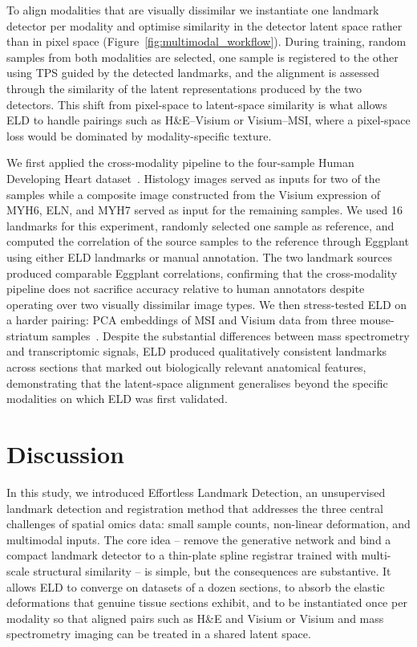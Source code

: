 \documentclass[11pt]{article}
\begin{document}
To align modalities that are visually dissimilar we instantiate one landmark detector per modality and optimise similarity in the detector latent space rather than in pixel space (Figure~\ref{fig:multimodal_workflow}). During training, random samples from both modalities are selected, one sample is registered to the other using TPS guided by the detected landmarks, and the alignment is assessed through the similarity of the latent representations produced by the two detectors. This shift from pixel-space to latent-space similarity is what allows ELD to handle pairings such as H\&E--Visium or Visium--MSI, where a pixel-space loss would be dominated by modality-specific texture.

We first applied the cross-modality pipeline to the four-sample Human Developing Heart dataset~\cite{asp2019spatiotemporal}. Histology images served as inputs for two of the samples while a composite image constructed from the Visium expression of MYH6, ELN, and MYH7 served as input for the remaining samples. We used 16 landmarks for this experiment, randomly selected one sample as reference, and computed the correlation of the source samples to the reference through Eggplant using either ELD landmarks or manual annotation. The two landmark sources produced comparable Eggplant correlations, confirming that the cross-modality pipeline does not sacrifice accuracy relative to human annotators despite operating over two visually dissimilar image types. We then stress-tested ELD on a harder pairing: PCA embeddings of MSI and Visium data from three mouse-striatum samples~\cite{vicari2024spatial}. Despite the substantial differences between mass spectrometry and transcriptomic signals, ELD produced qualitatively consistent landmarks across sections that marked out biologically relevant anatomical features, demonstrating that the latent-space alignment generalises beyond the specific modalities on which ELD was first validated.

\section{Discussion}

In this study, we introduced Effortless Landmark Detection, an unsupervised landmark detection and registration method that addresses the three central challenges of spatial omics data: small sample counts, non-linear deformation, and multimodal inputs. The core idea -- remove the generative network and bind a compact landmark detector to a thin-plate spline registrar trained with multi-scale structural similarity -- is simple, but the consequences are substantive. It allows ELD to converge on datasets of a dozen sections, to absorb the elastic deformations that genuine tissue sections exhibit, and to be instantiated once per modality so that aligned pairs such as H\&E and Visium or Visium and mass spectrometry imaging can be treated in a shared latent space.
\end{document}
